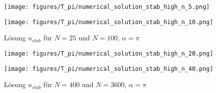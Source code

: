 \documentclass[12pt,titlepage]{article}
\begin{document}
\begin{figure}[H]
\hspace{0.1cm}
\begin{minipage}{0.4\textwidth}
\texttt{[image: figures/T\_pi/numerical\_solution\_stab\_high\_n\_5.png]}
\end{minipage}
\hspace{1.4cm}
\begin{minipage}{0.4\textwidth}
\texttt{[image: figures/T\_pi/numerical\_solution\_stab\_high\_n\_10.png]}
\end{minipage}
\caption{Lösung $u_{stab}$ für $N=25$ und $N=100$, $\alpha=\pi$}
\label{fig:stab_5_10_pi}
\end{figure}

\begin{figure}[H]
\hspace{0.1cm}
\begin{minipage}{0.4\textwidth}
\texttt{[image: figures/T\_pi/numerical\_solution\_stab\_high\_n\_20.png]}
\end{minipage}
\hspace{1.4cm}
\begin{minipage}{0.4\textwidth}
\texttt{[image: figures/T\_pi/numerical\_solution\_stab\_high\_n\_40.png]}
\end{minipage}
\caption{Lösung $u_{stab}$ für $N=400$ und $N=3600$, $\alpha=\pi$}
\label{fig:stab_20_40_pi}
\end{figure}
\end{document}
